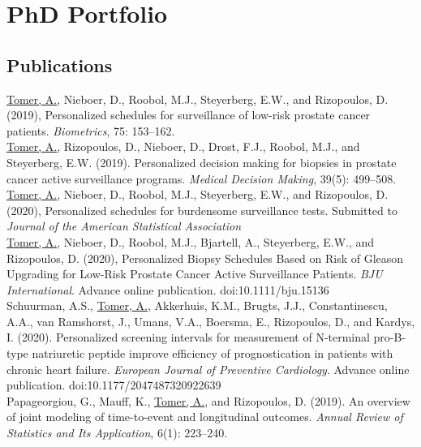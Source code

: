 \section{PhD Portfolio}

\subsection*{Publications}
\noindent \underline{Tomer, A.}, Nieboer, D., Roobol, M.J., Steyerberg, E.W., and Rizopoulos, D. (2019), Personalized schedules for surveillance of low-risk prostate cancer patients. \emph{Biometrics}, 75: 153--162.\\

\noindent \underline{Tomer, A.}, Rizopoulos, D., Nieboer, D., Drost, F.J., Roobol, M.J., and Steyerberg, E.W. (2019). Personalized decision making for biopsies in prostate cancer active surveillance programs. \emph{Medical Decision Making}, 39(5): 499--508.\\

\noindent \underline{Tomer, A.}, Nieboer, D., Roobol, M.J., Steyerberg, E.W., and Rizopoulos, D. (2020), Personalized schedules for burdensome surveillance tests. Submitted to \emph{Journal of the American Statistical Association}\\

\noindent \underline{Tomer, A.}, Nieboer, D., Roobol, M.J., Bjartell, A., Steyerberg, E.W., and Rizopoulos, D. (2020), Personalized Biopsy Schedules Based on Risk of Gleason Upgrading for Low-Risk Prostate Cancer Active Surveillance Patients. \emph{BJU International}. Advance online publication. doi:10.1111/bju.15136\\

\noindent Schuurman, A.S., \underline{Tomer, A.}, Akkerhuis, K.M., Brugts, J.J., Constantinescu, A.A., van Ramshorst, J., Umans, V.A., Boersma, E., Rizopoulos, D., and Kardys, I. (2020). Personalized screening intervals for measurement of N-terminal pro-B-type natriuretic peptide improve efficiency of prognostication in patients with chronic heart failure. \emph{European Journal of Preventive Cardiology}. Advance online publication. doi:10.1177/2047487320922639\\ 

\noindent Papageorgiou, G., Mauff, K., \underline{Tomer, A.}, and Rizopoulos, D. (2019). An overview of joint modeling of time-to-event and longitudinal outcomes. \emph{Annual Review of Statistics and Its Application}, 6(1): 223--240.\\

